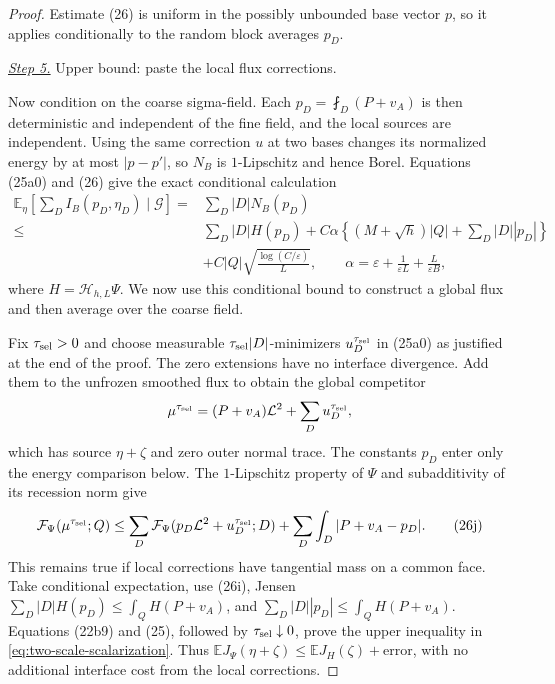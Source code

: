 \documentclass{smfart}
\theoremstyle{definition}
\newcommand{\1}{\mathbf 1}
\begin{document}
\begin{proof}
Estimate (26) is uniform in the possibly unbounded base vector $p$,
so it applies conditionally to the random block averages $p_D$.

\smallskip\noindent
\underline{\textit{Step 5.}} Upper bound: paste the local flux corrections.

Now condition on the coarse sigma-field.  Each
$p_ D=\fint_ D(P+v_ A)$ is then deterministic and independent of the
fine field, and the local sources are independent.  Using the same
correction $u$ at two bases changes its normalized energy by at most
$|p-p'|$, so $N_ B$ is $1$-Lipschitz and hence Borel.  Equations
(25a0) and (26) give the exact
conditional calculation
\begin{equation}
\begin{split}
\mathbb E_ \eta\!\left[\sum_ DI_ B(p_ D,\eta_ D)\mid\mathscr G\right]
={}&\sum_ D|D|N_ B(p_ D)\\
\leq{}&\sum_ D|D|H(p_ D)
+C\alpha\left\{(M+\sqrt h)|Q|+\sum_ D|D||p_ D|\right\}\\
&+C|Q|\sqrt{\frac{\log(C/\varepsilon)}L},\qquad
\alpha=\varepsilon+\frac1{\varepsilon L}
+\frac L{\varepsilon B},               
\end{split}
\tag{26i}
\end{equation}
where $H=\mathcal H_ {h,L}\Psi$.  We now use this conditional bound to construct a global flux and then
average over the coarse field.

Fix $\tau_{\rm sel}>0$ and choose measurable
$\tau_{\rm sel}|D|$-minimizers $u_ D^{\tau_{\rm sel}}$ in (25a0)
as justified at the end of the proof.  The zero extensions have no interface divergence.  Add them to the
unfrozen smoothed flux to obtain the global competitor
\begin{equation*}
\mu^{\tau_{\rm sel}}=(P+v_ A)\mathcal L^2+\sum_ Du_ D^{\tau_{\rm sel}},
\end{equation*}
which has source $\eta+\zeta$ and zero outer normal trace.  The constants
$p_D$ enter only the energy comparison below.  The $1$-Lipschitz property of $\Psi$ and
subadditivity of its recession norm give
\begin{equation}
\mathcal F_ \Psi(\mu^{\tau_{\rm sel}};Q)
\leq\sum_ D\mathcal F_ \Psi(p_ D\mathcal L^2+u_ D^{\tau_{\rm sel}};D)
+\sum_ D\int_ D|P+v_ A-p_ D|.
\tag{26j}
\end{equation}
This remains true if local corrections have tangential mass on a common
face.  Take conditional expectation, use (26i), Jensen
$\sum_ D|D|H(p_ D)\leq\int_ QH(P+v_ A)$, and
$\sum_ D|D||p_ D|\leq\int_ QH(P+v_ A)$.  Equations (22b9) and (25),
followed by $\tau_{\rm sel}\downarrow0$, prove the upper inequality in
\eqref{eq:two-scale-scalarization}.
Thus
$\mathbb EJ_ \Psi(\eta+\zeta)\leq\mathbb EJ_ H(\zeta)+\text{error}$,
with no additional interface cost from the local corrections.


\end{proof}
\end{document}
